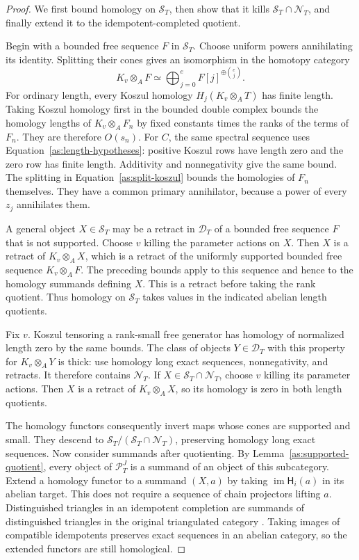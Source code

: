 \begin{proof}
We first bound homology on $\mathcal S_T$, then show that it kills
$\mathcal S_T\cap\mathcal N_T$, and finally extend it to the
idempotent-completed quotient.

Begin with a bounded free sequence $F$ in $\mathcal S_T$. Choose
uniform powers annihilating its identity. Splitting their cones
gives an isomorphism in the homotopy category
\begin{equation}
 K_v\otimes_A F\simeq
 \bigoplus_{j=0}^e F[j]^{\oplus\binom ej}.
 \label{as:split-koszul}
\end{equation}
For ordinary length, every Koszul homology $H_j(K_v\otimes_A T)$
has finite length. Taking Koszul homology first in the bounded
double complex bounds the homology lengths of $K_v\otimes_A F_n$
by fixed constants times the ranks of the terms of $F_n$. They
are therefore $O(s_n)$. For $C$, the same spectral sequence uses
Equation~\eqref{as:length-hypotheses}: positive Koszul rows have
length zero and the zero row has finite length. Additivity and
nonnegativity give the same bound. The splitting in
Equation~\eqref{as:split-koszul} bounds the homologies of $F_n$
themselves. They have a common primary annihilator, because a power
of every $z_j$ annihilates them.

A general object $X\in\mathcal S_T$ may be a retract in
$\mathcal D_T$ of a bounded free sequence $F$ that is not supported.
Choose $v$ killing the parameter actions on $X$. Then $X$ is a retract
of $K_v\otimes_A X$, which is a retract of the uniformly supported
bounded free sequence $K_v\otimes_A F$. The preceding bounds apply
to this sequence and hence to the homology summands defining $X$.
This is a retract before taking the rank quotient. Thus homology on
$\mathcal S_T$ takes
values in the indicated abelian length quotients.

Fix $v$. Koszul tensoring a rank-small free generator has homology
of normalized length zero by the same bounds. The class of objects
$Y\in\mathcal D_T$ with this property for $K_v\otimes_A Y$
is thick: use homology long exact sequences, nonnegativity, and
retracts. It therefore contains $\mathcal N_T$. If
$X\in\mathcal S_T\cap\mathcal N_T$, choose $v$ killing its
parameter actions. Then $X$ is a retract of $K_v\otimes_A X$,
so its homology is zero in both length quotients.

The homology functors consequently invert maps whose cones are
supported and small. They descend to
$\mathcal S_T/(\mathcal S_T\cap\mathcal N_T)$, preserving
homology long exact sequences. Now consider summands after quotienting.
By Lemma~\ref{as:supported-quotient},
every object of $\mathcal P_T^J$ is a summand of an object of this
subcategory. Extend a homology functor to a summand $(X,a)$ by
taking $\operatorname{im}\mathsf H_i(a)$ in its abelian target.
This does not require a sequence of chain projectors lifting $a$.
Distinguished triangles in an idempotent completion are summands
of distinguished triangles in the original triangulated category
\cite[Definition~1.10 and Theorem~1.12]{BalmerSchlichting}.
Taking images of compatible idempotents preserves exact sequences
in an abelian category, so the extended functors are still
homological.


\end{proof}
